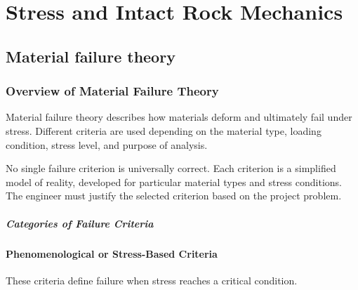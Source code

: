 \chapter{Stress and Intact Rock Mechanics}
\label{ch:stress-intact-rock}

\section{Material failure theory}
\label{sec:material-failure-theory}

\subsection{Overview of Material Failure Theory}

Material failure theory describes how materials deform and ultimately fail under stress.
Different criteria are used depending on the material type, loading condition, stress
level, and purpose of analysis.

\begin{keybox}
No single failure criterion is universally correct. Each criterion is a simplified model
of reality, developed for particular material types and stress conditions. The engineer
must justify the selected criterion based on the project problem.
\end{keybox}

\paragraph{Categories of Failure Criteria}

\subsubsection{Phenomenological or Stress-Based Criteria}

These criteria define failure when stress reaches a critical condition.

